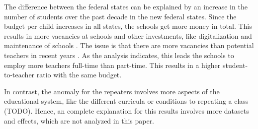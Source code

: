 The difference between the federal states can be explained by an increase in the number of students over the past decade in the new federal states. Since the budget per child  increases in all states, the schools get more money in total. This results in more vacancies at schools \cite{kultusminister_konferenz_lehrkrafteeinstellungsbedarf_2023} and other investments, like digitalization and maintenance of schools \cite{bundesministerium_fur_bildung_und_forschung_fortschrittsbericht_2022}. The issue is that there are more vacancies than potential teachers in recent years \cite{kultusminister_konferenz_lehrkrafteeinstellungsbedarf_2023}. As the analysis indicates, this leads the schools to employ more teachers full-time than part-time. This results in a higher student-to-teacher ratio with the same budget.

In contrast, the anomaly for the repeaters involves more aspects of the educational system, like the different curricula or conditions to repeating a class (TODO). Hence, an complete explanation for this results involves more datasets and effects, which are not analyzed in this paper.
